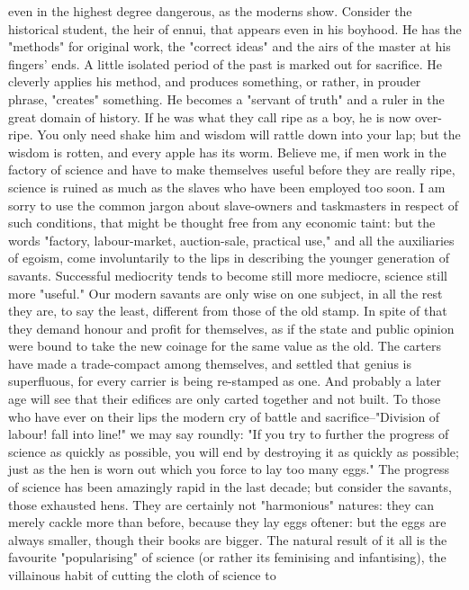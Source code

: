even in the highest degree dangerous, as the moderns show. Consider
the historical student, the heir of ennui, that appears even in his
boyhood. He has the "methods" for original work, the "correct ideas"
and the airs of the master at his fingers' ends. A little isolated
period of the past is marked out for sacrifice. He cleverly applies
his method, and produces something, or rather, in prouder phrase,
"creates" something. He becomes a "servant of truth" and a ruler in
the great domain of history. If he was what they call ripe as a boy,
he is now over-ripe. You only need shake him and wisdom will rattle
down into your lap; but the wisdom is rotten, and every apple has its
worm. Believe me, if men work in the factory of science and have to
make themselves useful before they are really ripe, science is ruined
as much as the slaves who have been employed too soon. I am sorry to
use the common jargon about slave-owners and taskmasters in respect
of such conditions, that might be thought free from any economic
taint: but the words "factory, labour-market, auction-sale, practical
use," and all the auxiliaries of egoism, come involuntarily to the
lips in describing the younger generation of savants. Successful
mediocrity tends to become still more mediocre, science still more
"useful." Our modern savants are only wise on one subject, in all the
rest they are, to say the least, different from those of the old
stamp. In spite of that they demand honour and profit for themselves,
as if the state and public opinion were bound to take the new coinage
for the same value as the old. The carters have made a trade-compact
among themselves, and settled that genius is superfluous, for every
carrier is being re-stamped as one. And probably a later age will see
that their edifices are only carted together and not built. To those
who have ever on their lips the modern cry of battle and
sacrifice--"Division of labour! fall into line!" we may say roundly:
"If you try to further the progress of science as quickly as
possible, you will end by destroying it as quickly as possible; just
as the hen is worn out which you force to lay too many eggs." The
progress of science has been amazingly rapid in the last decade; but
consider the savants, those exhausted hens. They are certainly not
"harmonious" natures: they can merely cackle more than before,
because they lay eggs oftener: but the eggs are always smaller,
though their books are bigger. The natural result of it all is the
favourite "popularising" of science (or rather its feminising and
infantising), the villainous habit of cutting the cloth of science to
